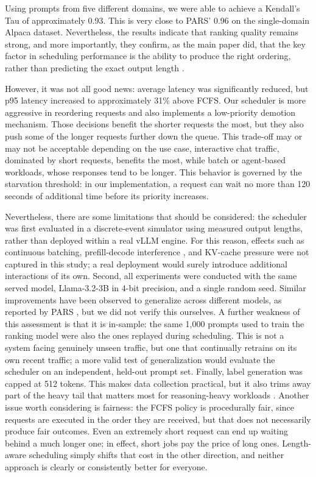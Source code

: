 \documentclass[conference]{IEEEtran}
\begin{document}
Using prompts from five different domains, we were able to achieve a Kendall's Tau of approximately 0.93. This is very close to PARS' 0.96 on the single-domain Alpaca dataset. Nevertheless, the results indicate that ranking quality remains strong, and more importantly, they confirm, as the main paper did, that the key factor in scheduling performance is the ability to produce the right ordering, rather than predicting the exact output length \cite{fu2024efficient}.

However, it was not all good news: average latency was significantly reduced, but p95 latency increased to approximately 31\% above FCFS.  Our scheduler is more aggressive in reordering requests and also implements a low-priority demotion mechanism. Those decisions benefit the shorter requests the most, but they also push some of the longer requests further down the queue. This trade-off may or may not be acceptable depending on the use case, interactive chat traffic, dominated by short requests, benefits the most, while batch or agent-based workloads, whose responses tend to be longer. This behavior is governed by the starvation threshold: in our implementation, a request can wait no more than 120 seconds of additional time before its priority increases. 

Nevertheless, there are some limitations that should be considered: the scheduler was first evaluated in a discrete-event simulator using measured output lengths, rather than deployed within a real vLLM engine. For this reason, effects such as continuous batching, prefill-decode interference \cite{agrawal2024sarathi}, and KV-cache pressure \cite{kwon2023pagedattention} were not captured in this study; a real deployment would surely introduce additional interactions of its own.
Second, all experiments were conducted with the same served model, Llama-3.2-3B in 4-bit precision, and a single random seed. Similar improvements have been observed to generalize across different models, as reported by PARS \cite{tao2025pars}, but we did not verify this ourselves.
A further weakness of this assessment is that it is in-sample: the same 1{,}000 prompts used to train the ranking model were also the ones replayed during scheduling. This is not a system facing genuinely unseen traffic, but one that continually retrains on its own recent traffic; a more valid test of generalization would evaluate the scheduler on an independent, held-out prompt set. Finally, label generation was capped at 512 tokens. This makes data collection practical, but it also trims away part of the heavy tail that matters most for reasoning-heavy workloads \cite{guo2025deepseekr1}.
Another issue worth considering is fairness: the FCFS policy is procedurally fair, since requests are executed in the order they are received, but that does not necessarily produce fair outcomes. Even an extremely short request can end up waiting behind a much longer one; in effect, short jobs pay the price of long ones. Length-aware scheduling simply shifts that cost in the other direction, and neither approach is clearly or consistently better for everyone. 
\end{document}
